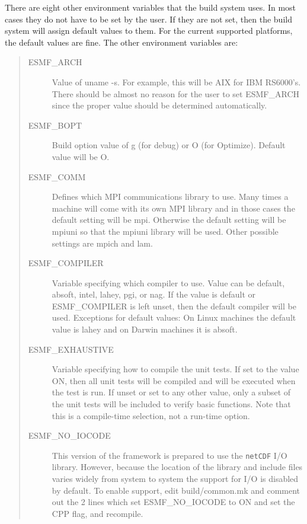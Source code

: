 There are eight other environment variables that the build system uses.
In most cases they do not have to be set by the user.  If they are not
set, then the build system will assign default values to them.  For the
current supported platforms, the default values are fine.  The other
environment variables are:
\begin{quote}
\begin{description}

  \item[ESMF\_ARCH] Value of uname -s.  For example, this will be AIX for IBM
                 RS6000's.  There should be almost no reason for the
                 user to set ESMF\_ARCH since the proper value should be
                 determined automatically.

  \item[ESMF\_BOPT] Build option value of g (for debug) or O (for
                 Optimize).  Default value will be O.

  \item[ESMF\_COMM] Defines which MPI communications library to use.  
                 Many times a machine will come with its own MPI 
                 library and in those cases the default setting 
                 will be mpi.  Otherwise the default setting will be 
                 mpiuni so that the mpiuni library will be used.
                 Other possible settings are mpich and lam.

  \item[ESMF\_COMPILER] Variable specifying which compiler to use.  Value
                 can be default, absoft, intel, lahey, pgi, or nag. 
                 If the value is default or ESMF\_COMPILER is 
                 left unset, then the default compiler 
                 will be used.  Exceptions for default values:  
                 On Linux machines the default value 
                 is lahey and on Darwin machines it is absoft.

  \item[ESMF\_EXHAUSTIVE] Variable specifying how to compile the unit tests.
                 If set to the value ON, then all unit tests will be compiled
                 and will be executed when the test is run.  If unset or set 
                 to any other value, only a subset of the unit tests will 
                 be included to verify basic functions.  Note that this
                 is a compile-time selection, not a run-time option.

  \item[ESMF\_NO\_IOCODE] This version of the framework is prepared to use
                 the {\tt netCDF} I/O library.  However, because the location
                 of the library and include files varies widely from 
                 system to system the support for I/O is disabled by default.
                 To enable support, edit build/common.mk and comment out the 2
                 lines which set ESMF\_NO\_IOCODE to ON and set the CPP flag,
                 and recompile.


\end{description}
\end{quote}
